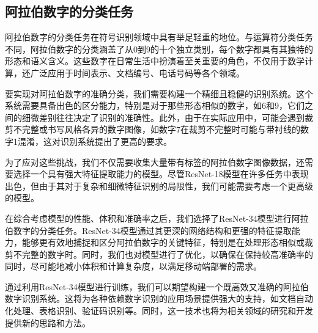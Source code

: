 \subsection{阿拉伯数字的分类任务}

阿拉伯数字的分类任务在符号识别领域中具有举足轻重的地位。与运算符分类任务不同，阿拉伯数字的分类涵盖了从0到9的十个独立类别，每个数字都具有其独特的形态和语义含义。这些数字在日常生活中扮演着至关重要的角色，不仅用于数学计算，还广泛应用于时间表示、文档编号、电话号码等各个领域。

要实现对阿拉伯数字的准确分类，我们需要构建一个精细且稳健的识别系统。这个系统需要具备出色的区分能力，特别是对于那些形态相似的数字，如6和9，它们之间的细微差别往往决定了识别的准确性。此外，由于在实际应用中，可能会遇到裁剪不完整或书写风格各异的数字图像，如数字7在裁剪不完整时可能与带衬线的数字1混淆，这对识别系统提出了更高的要求。

为了应对这些挑战，我们不仅需要收集大量带有标签的阿拉伯数字图像数据，还需要选择一个具有强大特征提取能力的模型。尽管ResNet-18模型在许多任务中表现出色，但由于其对于复杂和细微特征识别的局限性，我们可能需要考虑一个更高级的模型。

在综合考虑模型的性能、体积和准确率之后，我们选择了ResNet-34模型进行阿拉伯数字的分类任务。ResNet-34模型通过其更深的网络结构和更强的特征提取能力，能够更有效地捕捉和区分阿拉伯数字的关键特征，特别是在处理形态相似或裁剪不完整的数字时。同时，我们也对模型进行了优化，以确保在保持较高准确率的同时，尽可能地减小体积和计算复杂度，以满足移动端部署的需求。

通过利用ResNet-34模型进行训练，我们可以期望构建一个既高效又准确的阿拉伯数字识别系统。这将为各种依赖数字识别的应用场景提供强大的支持，如文档自动化处理、表格识别、验证码识别等。同时，这一技术也将为相关领域的研究和开发提供新的思路和方法。

